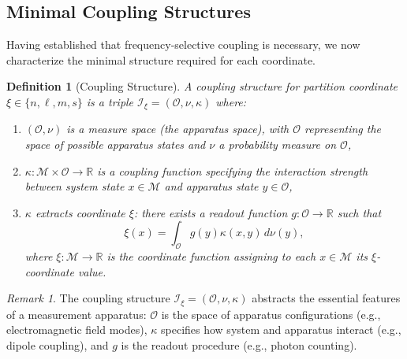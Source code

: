\documentclass[twocolumn,10pt,a4paper]{article}
\newtheorem{definition}[theorem]{Definition}
\theoremstyle{remark}
\newtheorem{remark}[theorem]{Remark}
\newcommand{\manifold}{\mathcal{M}}
\newcommand{\oscillator}{\mathcal{O}}
\newcommand{\Reals}{\mathbb{R}}
\begin{document}
\subsection{Minimal Coupling Structures}

Having established that frequency-selective coupling is necessary, we now characterize the minimal structure required for each coordinate.

\begin{definition}[Coupling Structure]
\label{def:coupling_structure}
A \emph{coupling structure} for partition coordinate $\xi \in \{n, \ell, m, s\}$ is a triple $\mathcal{I}_\xi = (\oscillator, \nu, \kappa)$ where:
\begin{enumerate}[label=(\roman*), noitemsep]
    \item $(\oscillator, \nu)$ is a measure space (the \emph{apparatus space}), with $\oscillator$ representing the space of possible apparatus states and $\nu$ a probability measure on $\oscillator$,
    \item $\kappa: \manifold \times \oscillator \to \Reals$ is a \emph{coupling function} specifying the interaction strength between system state $x \in \manifold$ and apparatus state $y \in \oscillator$,
    \item $\kappa$ \emph{extracts coordinate $\xi$}: there exists a readout function $g: \oscillator \to \Reals$ such that
    \begin{equation}
    \xi(x) = \int_\oscillator g(y) \kappa(x, y) \, d\nu(y),
    \end{equation}
    where $\xi: \manifold \to \Reals$ is the coordinate function assigning to each $x \in \manifold$ its $\xi$-coordinate value.
\end{enumerate}
\end{definition}

\begin{remark}
The coupling structure $\mathcal{I}_\xi = (\oscillator, \nu, \kappa)$ abstracts the essential features of a measurement apparatus: $\oscillator$ is the space of apparatus configurations (e.g., electromagnetic field modes), $\kappa$ specifies how system and apparatus interact (e.g., dipole coupling), and $g$ is the readout procedure (e.g., photon counting).
\end{remark}
\end{document}
